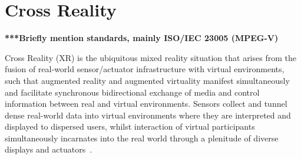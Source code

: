 

%


\section{Cross Reality}
\label{sec_crossreality}

\textbf{***Briefly mention standards, mainly ISO/IEC 23005 (MPEG-V)}

\newcommand{\SLfootnote}{\footnote{Second Life.}}

Cross Reality (XR) is the ubiquitous mixed reality situation that arises from the fusion of real-world sensor/actuator infrastructure with virtual environments, such that augmented reality and augmented virtuality manifest simultaneously and facilitate synchronous bidirectional exchange of media and control information between real and virtual environments. Sensors collect and tunnel dense real-world data into virtual environments where they are interpreted and displayed to dispersed users, whilst interaction of virtual participants simultaneously incarnates into the real world through a plenitude of diverse displays and actuators~\cite{Paradiso2009}.

